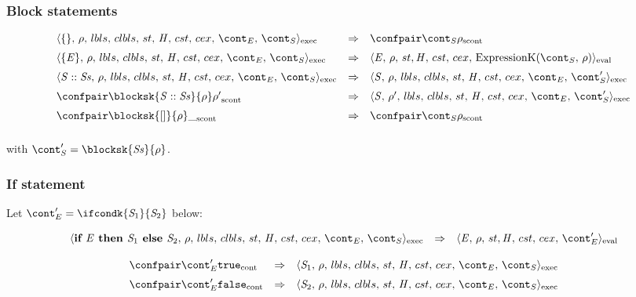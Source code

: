 \documentclass{article}
\begin{document}
\subsubsection{Block statements}

\[
  \begin{array}{lcl}
	\execconf{\lbrace\rbrace}{\env}{\lbls}{\clbls}{\handler}{\cstrace}{\cex}{\econt}{\scont}
	& \Rightarrow &
	\scontconf{\scont}{\env}\\[2mm]

	\execconf{\lbrace\expr\rbrace}{\env}{\lbls}{\clbls}{\handler}{\cstrace}{\cex}{\econt}{\scont}
	& \Rightarrow &
	\evalconf{\expr}{\env}{\strace}{\cstrace}{\cex}{\ExpressionK{\scont}{\env}}\\[2mm]

	\execconf{\stmt :: \stmts}{\env}{\lbls}{\clbls}{\handler}{\cstrace}{\cex}{\econt}{\scont}
	& \Rightarrow &
	\execconf{\stmt}{\env}{\lbls}{\clbls}{\handler}{\cstrace}{\cex}{\econt}{\scont'}\\[2mm]

	\scontconf{\blocksk{\stmt :: \stmts}{\env}}{\env'}
	& \Rightarrow &
	\execconf{\stmt}{\env'}{\lbls}{\clbls}{\handler}{\cstrace}{\cex}{\econt}{\scont'}\\[2mm]

	\scontconf{\blocksk{[]}{\env}}{ \_ }
	& \Rightarrow &
	\scontconf{\scont}{\env}\\[2mm]

  \end{array}
\]

with $\scont' = \blocksk{\stmts}{\env}$.

\subsubsection{If statement}

Let $\econt' = \ifcondk{\stmti{1}}{\stmti{2}}$ below:

\[
  \begin{array}{lcl}
	\execconf{\textbf{if } \expr \textbf{ then } \stmti{1} \textbf{ else } \stmti{2} }{\env}{\lbls}{\clbls}{\handler}{\cstrace}{\cex}{\econt}{\scont}
	& \Rightarrow &
	\evalconf{\expr}{\env}{\strace}{\cstrace}{\cex}{\econt'}\\[2mm]
  \end{array}
\]
\[
  \begin{array}{lcl}
	\contconf{\econt'}{\true} 
	& \Rightarrow &
	\execconf{\stmti{1}}{\env}{\lbls}{\clbls}{\handler}{\cstrace}{\cex}{\econt}{\scont}\\[2mm]

	\contconf{\econt'}{\false} 
	& \Rightarrow &
	\execconf{\stmti{2}}{\env}{\lbls}{\clbls}{\handler}{\cstrace}{\cex}{\econt}{\scont}\\
  \end{array}
\]
\end{document}
